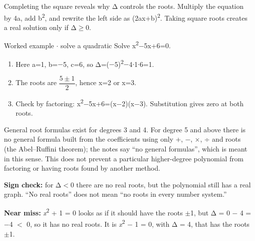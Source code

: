 \documentclass[11pt]{article}
\begin{document}
\begin{keepsection}
\begin{keepsection}
Completing the square reveals why Δ controls the roots. Multiply the equation by 4a, add b\textsuperscript{2}, and rewrite the left side as (2ax+b)\textsuperscript{2}. Taking square roots creates a real solution only if Δ\ensuremath{\geq}0.

\begin{workedbox}{Worked example \ensuremath{\cdot} solve a quadratic}
Solve x\textsuperscript{2}\ensuremath{-}5x+6=0.

\begin{enumerate}
\item Here a=1, b=\ensuremath{-}5, c=6, so Δ=(\ensuremath{-}5)\textsuperscript{2}\ensuremath{-}4\ensuremath{\cdot}1\ensuremath{\cdot}6=1.
\item The roots are {\small\ensuremath{\dfrac{5\pm 1}{2}}}, hence x=2 or x=3.
\item Check by factoring: x\textsuperscript{2}\ensuremath{-}5x+6=(x\ensuremath{-}2)(x\ensuremath{-}3). Substitution gives zero at both roots.
\end{enumerate}
\end{workedbox}

General root formulas exist for degrees 3 and 4. For degree 5 and above there is no general formula built from the coefficients using only +, \ensuremath{-}, \ensuremath{\times}, ÷ and roots (the Abel–Ruffini theorem); the notes say “no general formulas”, which is meant in this sense. This does not prevent a particular higher-degree polynomial from factoring or having roots found by another method.

\begin{notebox}\textbf{Sign check:} for Δ\ensuremath{<}0 there are no real roots, but the polynomial still has a real graph. “No real roots” does not mean “no roots in every number system.”\end{notebox}

\begin{notebox}\textbf{Near miss:} \textit{x}\textsuperscript{2} + 1 = 0 looks as if it should have the roots \ensuremath{\pm}1, but Δ = 0 \ensuremath{-} 4 = \ensuremath{-}4 \ensuremath{<} 0, so it has no real roots. It is \textit{x}\textsuperscript{2} \ensuremath{-} 1 = 0, with Δ = 4, that has the roots \ensuremath{\pm}1.\end{notebox}
\end{keepsection}

\begin{keepsection}

\end{keepsection}
\end{keepsection}
\end{document}
